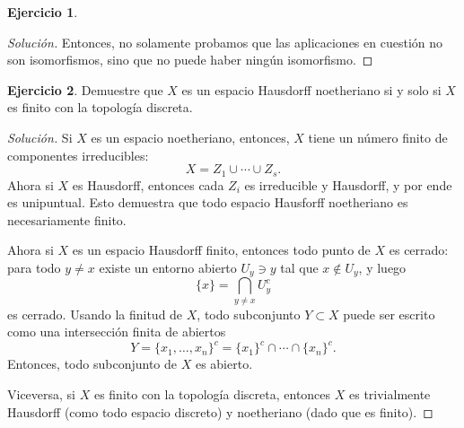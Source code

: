 \documentclass{article}
\theoremstyle{definition}
\newtheorem{ejerc}{Ejercicio}
\newenvironment{solucion}{\begin{proof}[Solución]}{\end{proof}}
\begin{document}
\begin{ejerc}
\begin{solucion}
    Entonces, no solamente probamos que las aplicaciones en cuestión no son
    isomorfismos, sino que no puede haber ningún isomorfismo.
  \end{solucion}\fi
\end{ejerc}

\begin{ejerc}
  Demuestre que $X$ es un espacio Hausdorff noetheriano si y solo si $X$ es
  finito con la topología discreta.

  \ifdefined\solutions\begin{solucion}
    Si $X$ es un espacio noetheriano, entonces, $X$ tiene un número finito de
    componentes irreducibles:
    $$X = Z_1 \cup \cdots \cup Z_s.$$
    Ahora si $X$ es Hausdorff, entonces cada $Z_i$ es irreducible y Hausdorff,
    y por ende es unipuntual. Esto demuestra que todo espacio Hausforff
    noetheriano es necesariamente finito.

    Ahora si $X$ es un espacio Hausdorff finito, entonces todo punto de $X$ es
    cerrado: para todo $y \ne x$ existe un entorno abierto $U_y \ni y$ tal que
    $x \notin U_y$, y luego
    $$\{ x \} = \bigcap_{y\ne x} U_y^c$$
    es cerrado. Usando la finitud de $X$, todo subconjunto $Y \subset X$ puede
    ser escrito como una intersección finita de abiertos
    $$Y = \{ x_1, \ldots, x_n \}^c = \{ x_1 \}^c \cap \cdots \cap \{ x_n \}^c.$$
    Entonces, todo subconjunto de $X$ es abierto.

    Viceversa, si $X$ es finito con la topología discreta, entonces $X$ es
    trivialmente Hausdorff (como todo espacio discreto) y noetheriano (dado que
    es finito).
  \end{solucion}\fi
\end{ejerc}
\end{document}
